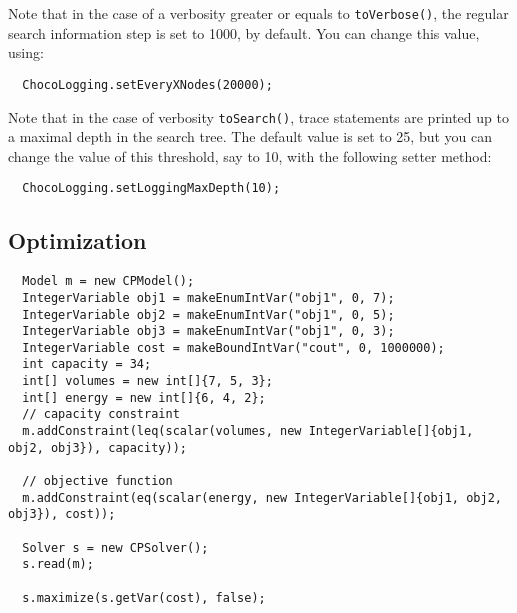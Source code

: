 Note that in the case of a verbosity greater or equals to \texttt{toVerbose()}, the regular search information step is set to 1000, by default. You can change this value, using:
\begin{lstlisting}
  ChocoLogging.setEveryXNodes(20000);
\end{lstlisting}
 

Note that in the case of verbosity \texttt{toSearch()}, trace statements are printed up to a maximal depth in the search tree. The default value is set to 25, but you can change the value of this threshold, say to 10, with the following setter method:
\begin{lstlisting}
  ChocoLogging.setLoggingMaxDepth(10);
\end{lstlisting}

\subsection{Optimization}\label{solver:optimization}\hypertarget{solver:optimization}{}
\begin{lstlisting}
  Model m = new CPModel();
  IntegerVariable obj1 = makeEnumIntVar("obj1", 0, 7);
  IntegerVariable obj2 = makeEnumIntVar("obj1", 0, 5);
  IntegerVariable obj3 = makeEnumIntVar("obj1", 0, 3);
  IntegerVariable cost = makeBoundIntVar("cout", 0, 1000000);
  int capacity = 34;
  int[] volumes = new int[]{7, 5, 3};
  int[] energy = new int[]{6, 4, 2};
  // capacity constraint
  m.addConstraint(leq(scalar(volumes, new IntegerVariable[]{obj1, obj2, obj3}), capacity));
	
  // objective function
  m.addConstraint(eq(scalar(energy, new IntegerVariable[]{obj1, obj2, obj3}), cost));
  
  Solver s = new CPSolver();
  s.read(m);
  
  s.maximize(s.getVar(cost), false);
\end{lstlisting}
